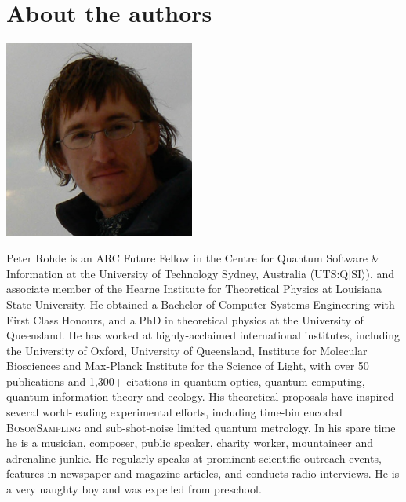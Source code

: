 %
%

\section*{About the authors}

%
%

\begin{center}
\includegraphics[width=0.47\textwidth]{photo_peter_rohde}
\end{center}

Peter Rohde is an ARC Future Fellow in the Centre for Quantum Software \& Information at the University of Technology Sydney, Australia (UTS:Q$|$SI$\rangle$), and associate member of the Hearne Institute for Theoretical Physics at Louisiana State University. He obtained a Bachelor of Computer Systems Engineering with First Class Honours, and a PhD in theoretical physics at the University of Queensland. He has worked at highly-acclaimed international institutes, including the University of Oxford, University of Queensland, Institute for Molecular Biosciences and Max-Planck Institute for the Science of Light, with over 50 publications and 1,300+ citations in quantum optics, quantum computing, quantum information theory and ecology. His theoretical proposals have inspired several world-leading experimental efforts, including time-bin encoded \textsc{BosonSampling} and sub-shot-noise limited quantum metrology. In his spare time he is a musician, composer, public speaker, charity worker, mountaineer and adrenaline junkie. He regularly speaks at prominent scientific outreach events, features in newspaper and magazine articles, and conducts radio interviews. He is a very naughty boy and was expelled from preschool.

%
%

